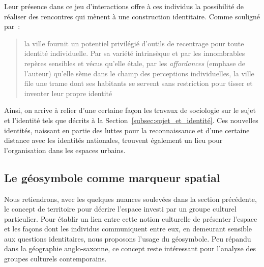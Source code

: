 Leur présence dans ce jeu d'interactions offre à ces individus la possibilité de réaliser des rencontres qui mènent à une construction identitaire.
Comme souligné par~\citeauthor{DiMeo2007}: \blockquote[{\cite[81]{DiMeo2007}}][.]{\textelp{} la ville fournit un potentiel privilégié d’outils de recentrage pour toute identité individuelle. Par sa variété intrinsèque et par les innombrables repères sensibles et vécus qu’elle étale, par les \emph{affordances} (emphase de l'auteur) qu’elle sème dans le champ des perceptions individuelles, la ville file une trame dont ses habitants se servent sans restriction pour tisser et inventer leur propre identité}.

Ainsi, on arrive à relier d'une certaine façon les travaux de sociologie sur le sujet et l'identité tels que décrits à la Section~\ref{subsec:sujet_et_identité}.
Ces nouvelles identités, naissant en partie des luttes pour la reconnaissance et d'une certaine distance avec les identités nationales, trouvent également un lieu pour l'organisation dans les espaces urbains.





\subsection{Le géosymbole comme marqueur spatial}
\label{sec:le_symbole_comme_marqueur_spatial} Nous retiendrons, avec les quelques nuances soulevées dans la section précédente, le concept de territoire pour décrire l'espace investi par un groupe culturel particulier.
Pour établir un lien entre cette notion culturelle de présenter l'espace et les façons dont les individus communiquent entre eux, en demeurant sensible aux questions identitaires, nous proposons l'usage du géosymbole.
Peu répandu dans la géographie anglo-saxonne, ce concept reste intéressant pour l'analyse des groupes culturels contemporains.

